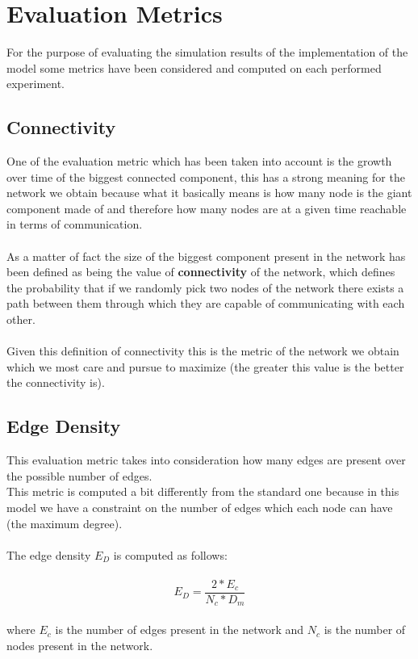 \documentclass{llncs}
\begin{document}
\section{Evaluation Metrics}
For the purpose of evaluating the simulation results of the implementation of the model some metrics have been considered and computed on each performed experiment.\\
%
\subsection{Connectivity}
One of the evaluation metric which has been taken into account is the growth over time of the biggest connected component, this has a strong meaning for the network we obtain because what it basically means is how many node is the giant component made of and therefore how many nodes are at a given time reachable in terms of communication.\\\\
%
As a matter of fact the size of the biggest component present in the network has been defined as being the value of \textbf{connectivity} of the network, which defines the probability that if we randomly pick two nodes of the network there exists a path between them through which they are capable of communicating with each other.\\\\
%
Given this definition of connectivity this is the metric of the network we obtain which we most care and pursue to maximize (the greater this value is the better the connectivity is).
\subsection{Edge Density}
This evaluation metric takes into consideration how many edges are present over the possible number of edges.\\
This metric is computed a bit differently from the standard one because in this model we have a constraint on the number of edges which each node can have (the maximum degree).\\\\
%
The edge density $E_{D}$ is computed as follows:\\\\
%
\[ E_{D} = \frac{2 * E_{c} }{ N_{c} * D_{m} }  \]
\\
where $E_{c}$ is the number of edges present in the network and $N_{c}$ is the number of nodes present in the network.
\end{document}
